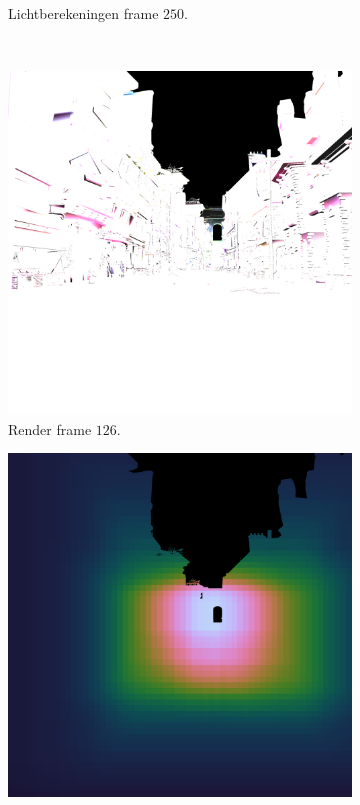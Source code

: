 \begin{figure}[t]
\begin{subfigure}[b]{0.35\textwidth}
    \caption{Lichtberekeningen frame $250$.}
    \vspace{2pt}
    \label{fig:ts-test-frames-example:sa:250lc}
  \end{subfigure}\\
  \begin{subfigure}[b]{0.35\textwidth}
    \includegraphics[width=\textwidth]{./img/raw/lc-frame-example/render/pa_frame_126.png}
    \caption{Render frame $126$.}
    \vspace{2pt}
    \label{fig:ts-test-frames-example:pa:126render}
  \end{subfigure}\quad %
  \begin{subfigure}[b]{0.35\textwidth}
    \includegraphics[width=\textwidth]{./img/raw/lc-frame-example/ts/pa_frame_126.png}

\end{subfigure}
\end{figure}
